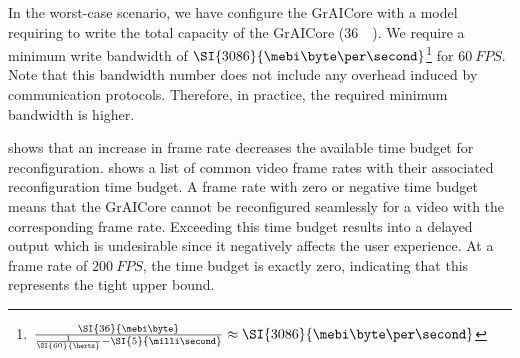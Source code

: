 In the worst-case scenario, we have configure the GrAICore with a model requiring to write the total capacity of the GrAICore (\SI{36}{\mebi\byte}).
We require a minimum write bandwidth of $\SI{3086}{\mebi\byte\per\second}$\footnote{$\frac{\SI{36}{\mebi\byte}}{\frac{1}{\SI{60}{\hertz}} - \SI{5}{\milli\second}} \approx \SI{3086}{\mebi\byte\per\second}$} for $\SI{60}{FPS}$.
Note that this bandwidth number does not include any overhead induced by communication protocols. Therefore, in practice, the required minimum bandwidth is higher. 

 shows that an increase in frame rate decreases the available time budget for reconfiguration.
 shows a list of common video frame rates with their associated reconfiguration time budget.
A frame rate with zero or negative time budget means that the GrAICore cannot be reconfigured seamlessly for a video with the corresponding frame rate.
Exceeding this time budget results into a delayed output which is undesirable since it negatively affects the user experience.
At a frame rate of $\SI{200}{FPS}$, the time budget is exactly zero, indicating that this represents the tight upper bound.

%     


